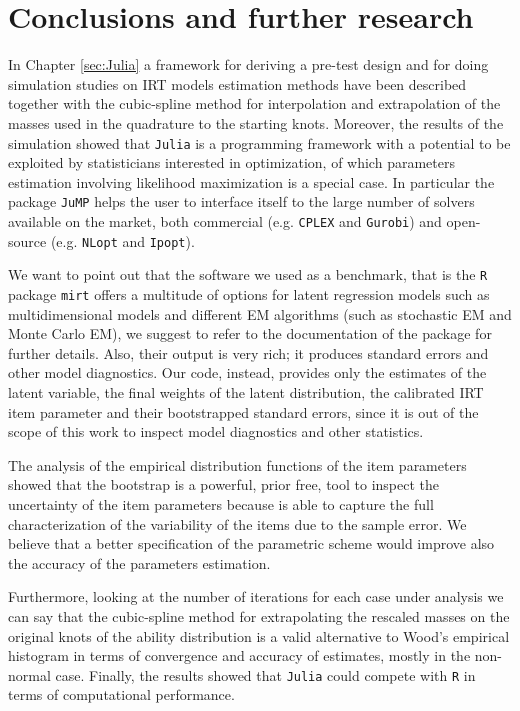 \chapter{Conclusions and further research}\label{sec:conclusions}



In Chapter \ref{sec:Julia} a framework for deriving a pre-test design and for doing simulation studies on IRT models estimation methods have been described together with the cubic-spline method for interpolation and extrapolation of the masses used in the quadrature to the starting knots.
Moreover, the results of the simulation showed that \texttt{Julia} is a programming framework with a potential to be exploited by statisticians interested in optimization, of which parameters estimation involving likelihood maximization is a special case. In particular the package \texttt{JuMP} helps the user to interface itself to the large number of solvers available on the market, both commercial (e.g. \texttt{CPLEX} and \texttt{Gurobi}) and open-source (e.g. \texttt{NLopt} and \texttt{Ipopt}).

We want to point out that the software we used as a benchmark, that is the \texttt{R} package \texttt{mirt} offers a multitude of options for latent regression models such as multidimensional models and different EM algorithms (such as stochastic EM and Monte Carlo EM), we suggest to refer to the documentation of the package for further details. Also, their output is very rich; it produces standard errors and other model diagnostics. Our code, instead, provides only the estimates of the latent variable, the final weights of the latent distribution, the calibrated IRT item parameter and their bootstrapped standard errors, since it is out of the scope of this work to inspect model diagnostics and other statistics. 

The analysis of the empirical distribution functions of the item parameters showed that the bootstrap is a powerful, prior free, tool to inspect the uncertainty of the item parameters because is able to capture the full characterization of the variability of the items due to the sample error. We believe that a better specification of the parametric scheme would improve also the accuracy of the parameters estimation.

Furthermore, looking at the number of iterations for each case under analysis we can say that the cubic-spline method for extrapolating the rescaled masses on the original knots of the ability distribution is a valid alternative to Wood's empirical histogram in terms of convergence and accuracy of estimates, mostly in the non-normal case.
Finally, the results showed that \texttt{Julia} could compete with \texttt{R} in terms of computational performance.





